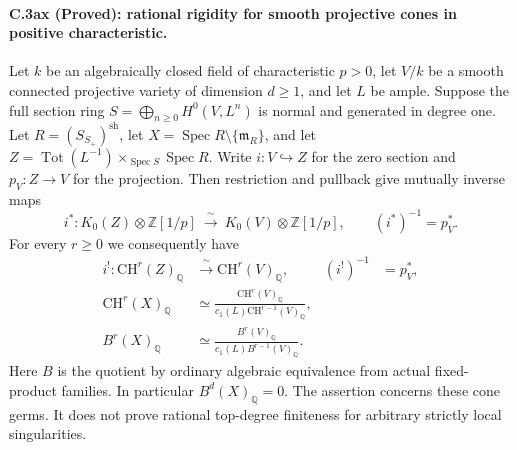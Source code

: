 \paragraph{C.3ax (Proved): rational rigidity for smooth projective cones in positive characteristic.}
Let $k$ be an algebraically closed field of characteristic $p>0$,
let $V/k$ be a smooth connected projective variety of dimension $d\ge1$,
and let $L$ be ample. Suppose the full section ring
$S=\bigoplus_{n\ge0}H^0(V,L^n)$ is normal and generated in degree one.
Let $R=(S_{S_+})^{\mathrm{sh}}$, let
$X=\operatorname{Spec}R\setminus\{\mathfrak m_R\}$, and let
$Z=\operatorname{Tot}(L^{-1})\times_{\operatorname{Spec}S}\operatorname{Spec}R$.
Write $i:V\hookrightarrow Z$ for the zero section and $p_V:Z\to V$
for the projection. Then restriction and pullback give mutually inverse maps
\begin{equation}\label{eq:C3ax-K}
 i^*:K_0(Z)\otimes\mathbb Z[1/p]
       \ \xrightarrow{\ \sim\ }\ K_0(V)\otimes\mathbb Z[1/p],
 \qquad (i^*)^{-1}=p_V^*.
\end{equation}
For every $r\ge0$ we consequently have
\begin{align}
 i^!: \mathrm{CH}^r(Z)_{\mathbb Q}
     &\xrightarrow{\ \sim\ }\mathrm{CH}^r(V)_{\mathbb Q},
          & (i^!)^{-1}&=p_V^*,\label{eq:C3ax-Chow}\\
 \mathrm{CH}^r(X)_{\mathbb Q}
     &\simeq\frac{\mathrm{CH}^r(V)_{\mathbb Q}}
                       {c_1(L)\mathrm{CH}^{r-1}(V)_{\mathbb Q}},\label{eq:C3ax-open}\\
 B^r(X)_{\mathbb Q}
     &\simeq\frac{B^r(V)_{\mathbb Q}}
                       {c_1(L)B^{r-1}(V)_{\mathbb Q}}.\label{eq:C3ax-B}
\end{align}
Here $B$ is the quotient by ordinary algebraic equivalence from actual
fixed-product families. In particular $B^d(X)_{\mathbb Q}=0$.
The assertion concerns these cone germs. It does not prove rational
top-degree finiteness for arbitrary strictly local singularities.

